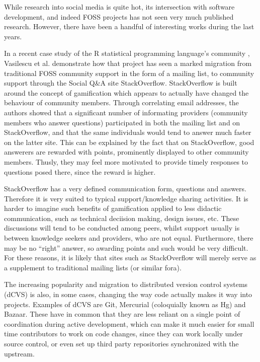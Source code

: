 \documentclass[a4paper,11pt]{article} %
\begin{document}
While research into social media is quite hot, its intersection with
software development, and indeed FOSS projects has not seen very much
published research. However, there have been a handful of interesting
works during the last years.

In a recent case study of the R statistical programming language's
community \cite{Vasilescu14StackOverflow}, Vasilescu et
al. demonstrate how that project has seen a marked migration from
traditional FOSS community support in the form of a mailing list, to
community support through the Social Q\&{}A site
StackOverflow. StackOverflow is built around the concept of
gamification\cite{deterding2011game} which appears to actually have
changed the behaviour of community members. Through correlating email
addresses, the authors showed that a significant number of informating
providers (community members who answer questions) participated in
both the mailing list and on StackOverflow, and that the same
individuals would tend to answer much faster on the latter site. This
can be explained by the fact that on StackOverflow, good answerers are
rewarded with points, prominently displayed to other community
members. Thusly, they may feel more motivated to provide timely
responses to questions posed there, since the reward is higher.


StackOverflow has a very defined communication form, questions and
answers. Therefore it is very suited to typical support/knowledge
sharing activities. It is harder to imagine such benefits of
gamification applied to less didactic communication, such as technical
deciision making, design issues, etc. These discussions will tend to
be conducted among peers, whilst support usually is between knowledge
seekers and providers, who are not equal. Furthermore, there may be no
``right'' answer, so awarding points and such would be very
difficult. For these reasons, it is likely that sites such as
StackOverflow will merely serve as a supplement to traditional mailing
lists (or similar fora).


The increasing popularity and migration to distributed version control
systems (dCVS) is also, in some cases, changing the way code actually
makes it way into projects. Examples of dCVS are Git, Mercurial
(coloquially known as Hg) and Bazaar. These have in common that they
are less reliant on a single point of coordination during active
development, which can make it much easier for small time contributors
to work on code changes, since they can work locally under source
control, or even set up third party repositories synchronized with the
upstream.
\end{document}
